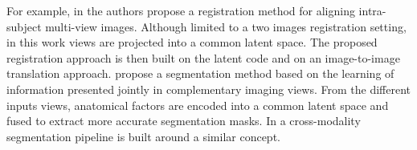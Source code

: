 	 For example, in \cite{Qin2019} the authors propose
	 a registration method for aligning intra-subject multi-view images.
	 Although limited to a two images registration setting,
	 in this work views are projected into a common latent space.
	 The proposed registration approach is then built on the latent code and on an image-to-image translation approach.
	 \cite{Chartsias2021} propose a segmentation method based on the learning of information presented jointly in complementary imaging views.
	 From the different inputs views, anatomical factors are encoded into a common latent space and fused to extract more accurate segmentation masks.
	 In \cite{Yang2020} a cross-modality segmentation pipeline is built around a similar concept.
